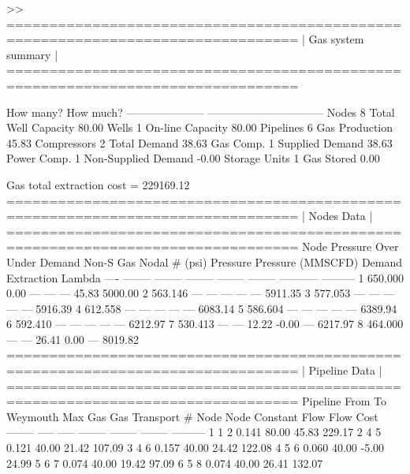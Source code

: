 \begin{small}
\begin{Code}
    >>  ================================================================================
	|     Gas system summary                                                       |
	================================================================================
	
	How many?                  How much?              
	---------------------    -------------------------------- 
	Nodes            8         Total Well Capacity    80.00 
	Wells            1         On-line Capacity       80.00
	Pipelines        6         Gas Production         45.83
	Compressors      2         Total Demand           38.63
	Gas Comp.        1           Supplied Demand      38.63
	Power Comp.      1           Non-Supplied Demand  -0.00
	Storage Units    1         Gas Stored              0.00
	
	Gas total extraction cost =   229169.12
	================================================================================
	|     Nodes Data                                                               |
	================================================================================
	Node   Pressure     Over      Under    Demand     Non-S      Gas         Nodal   
	  #      (psi)    Pressure  Pressure  (MMSCFD)   Demand   Extraction    Lambda  
	----   --------  --------  --------  --------  --------  -----------  ---------
	  1     650.000     0.00      ---       ---       ---        45.83      5000.00 
	  2     563.146     ---       ---       ---       ---         ---       5911.35 
	  3     577.053     ---       ---       ---       ---         ---       5916.39 
	  4     612.558     ---       ---       ---       ---         ---       6083.14 
	  5     586.604     ---       ---       ---       ---         ---       6389.94 
	  6     592.410     ---       ---       ---       ---         ---       6212.97 
	  7     530.413     ---       ---      12.22     -0.00        ---       6217.97 
	  8     464.000     ---       ---      26.41      0.00        ---       8019.82
	================================================================================
	|     Pipeline Data                                                            |
	================================================================================
	Pipeline    From      To      Weymouth    Max Gas       Gas       Transport
	   #        Node     Node     Constant     Flow         Flow        Cost    
	--------    -----    -----    --------    --------    --------    ---------
	   1          1        2        0.141       80.00       45.83       229.17 
	   2          4        5        0.121       40.00       21.42       107.09 
	   3          4        6        0.157       40.00       24.42       122.08 
	   4          5        6        0.060       40.00       -5.00        24.99 
	   5          6        7        0.074       40.00       19.42        97.09 
	   6          5        8        0.074       40.00       26.41       132.07 	 
\end{Code}
\end{small}


